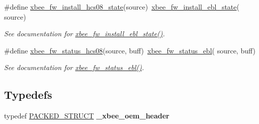 \begin{DoxyCompactItemize}
\#define \hyperlink{group__xbee__firmware_gae475cea6680670df9180ef1ce2603fb6}{xbee\+\_\+fw\+\_\+install\+\_\+hcs08\+\_\+state}(source)~\hyperlink{group__xbee__firmware_ga8590708a38ac57ace8c816cc7cfd0859}{xbee\+\_\+fw\+\_\+install\+\_\+ebl\+\_\+state}( source)
\begin{DoxyCompactList}\small\item\em See documentation for \hyperlink{group__xbee__firmware_ga8590708a38ac57ace8c816cc7cfd0859}{xbee\+\_\+fw\+\_\+install\+\_\+ebl\+\_\+state()}. \end{DoxyCompactList}\item 
\mbox{\label{group__xbee__firmware_ga8fb52237a7a070f5e2c56ef410c5f0f3}} 
\#define \hyperlink{group__xbee__firmware_ga8fb52237a7a070f5e2c56ef410c5f0f3}{xbee\+\_\+fw\+\_\+status\+\_\+hcs08}(source,  buff)~\hyperlink{group__xbee__firmware_ga8bee6e4bb7564c51bb38129e97a12e99}{xbee\+\_\+fw\+\_\+status\+\_\+ebl}( source, buff)
\begin{DoxyCompactList}\small\item\em See documentation for \hyperlink{group__xbee__firmware_ga8bee6e4bb7564c51bb38129e97a12e99}{xbee\+\_\+fw\+\_\+status\+\_\+ebl()}. \end{DoxyCompactList}\end{DoxyCompactItemize}
\subsection*{Typedefs}
\begin{DoxyCompactItemize}
\item 
typedef \hyperlink{group___s_x_a_ga4233297bd31be5c273d4fb0758cc54d7}{P\+A\+C\+K\+E\+D\+\_\+\+S\+T\+R\+U\+CT} {\bfseries \+\_\+xbee\+\_\+oem\+\_\+header}
\end{DoxyCompactItemize}
